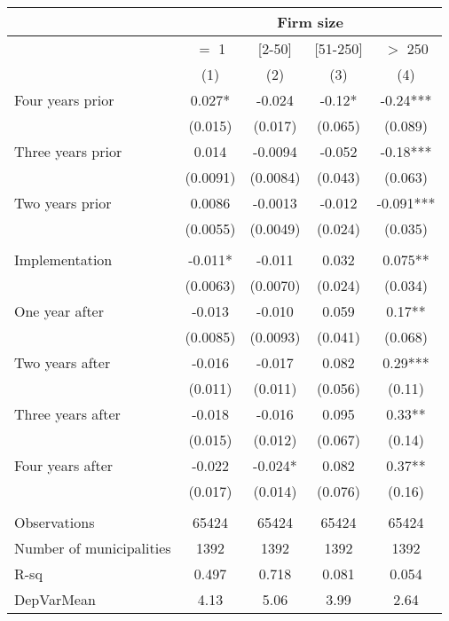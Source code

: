 \begin{tabular}{lcccc}
\toprule
      & \multicolumn{4}{c}{Firm size} \\
\midrule
      & $=$ 1 & [2-50] & [51-250] & $>$ 250 \\
\midrule
      & (1)   & (2)   & (3)   & (4) \\
\midrule
\midrule
Four years prior & 0.027* & -0.024 & -0.12* & -0.24*** \\
      & (0.015) & (0.017) & (0.065) & (0.089) \\
Three years prior & 0.014 & -0.0094 & -0.052 & -0.18*** \\
      & (0.0091) & (0.0084) & (0.043) & (0.063) \\
Two years prior & 0.0086 & -0.0013 & -0.012 & -0.091*** \\
      & (0.0055) & (0.0049) & (0.024) & (0.035) \\
      &       &       &       &  \\
Implementation & -0.011* & -0.011 & 0.032 & 0.075** \\
      & (0.0063) & (0.0070) & (0.024) & (0.034) \\
One year after & -0.013 & -0.010 & 0.059 & 0.17** \\
      & (0.0085) & (0.0093) & (0.041) & (0.068) \\
Two years after & -0.016 & -0.017 & 0.082 & 0.29*** \\
      & (0.011) & (0.011) & (0.056) & (0.11) \\
Three years after & -0.018 & -0.016 & 0.095 & 0.33** \\
      & (0.015) & (0.012) & (0.067) & (0.14) \\
Four years after & -0.022 & -0.024* & 0.082 & 0.37** \\
      & (0.017) & (0.014) & (0.076) & (0.16) \\
      &       &       &       &  \\
\midrule
Observations & 65424 & 65424 & 65424 & 65424 \\
Number of municipalities & 1392  & 1392  & 1392  & 1392 \\
R-sq  & 0.497 & 0.718 & 0.081 & 0.054 \\
DepVarMean & 4.13  & 5.06  & 3.99  & 2.64 \\
\bottomrule
\bottomrule
\end{tabular}%
